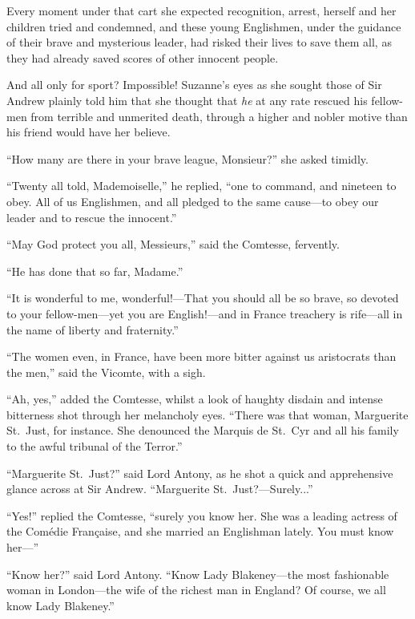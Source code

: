 \documentclass[paper=a5,BCOR=7mm,twoside,DIV=calc,12pt,usegeometry,chapterprefix,endperiod,headings=big]{scrbook}
\begin{document}
Every moment under that cart she expected recognition, arrest, herself and her children tried and condemned, and these young Englishmen, under the guidance of their brave and mysterious leader, had risked their lives to save them all, as they had already saved scores of other innocent people.

And all only for sport? Impossible! Suzanne's eyes as she sought those of Sir Andrew plainly told him that she thought that \textit{he} at any rate rescued his fellow-men from terrible and unmerited death, through a higher and nobler motive than his friend would have her believe.

\enquote{How many are there in your brave league, Monsieur?} she asked timidly.

\enquote{Twenty all told, Mademoiselle,} he replied, \enquote{one to command, and nineteen to obey. All of us Englishmen, and all pledged to the same cause---to obey our leader and to rescue the innocent.}

\enquote{May God protect you all, Messieurs,} said the Comtesse, fervently.

\enquote{He has done that so far, Madame.}

\enquote{It is wonderful to me, wonderful!---That you should all be so brave, so devoted to your fellow-men---yet you are English!---and in France treachery is rife---all in the name of liberty and fraternity.}

\enquote{The women even, in France, have been more bitter against us aristocrats than the men,} said the Vicomte, with a sigh.

\enquote{Ah, yes,} added the Comtesse, whilst a look of haughty disdain and intense bitterness shot through her melancholy eyes. \enquote{There was that woman, Marguerite St.~Just, for instance. She denounced the Marquis de St.~Cyr and all his family to the awful tribunal of the Terror.}

\enquote{Marguerite St.~Just?} said Lord Antony, as he shot a quick and apprehensive glance across at Sir Andrew. \enquote{Marguerite St.~Just?---Surely...}

\enquote{Yes!} replied the Comtesse, \enquote{surely you know her. She was a leading actress of the Comédie Française, and she married an Englishman lately. You must know her---}

\enquote{Know her?} said Lord Antony. \enquote{Know Lady Blakeney---the most fashionable woman in London---the wife of the richest man in England? Of course, we all know Lady Blakeney.}
\end{document}
